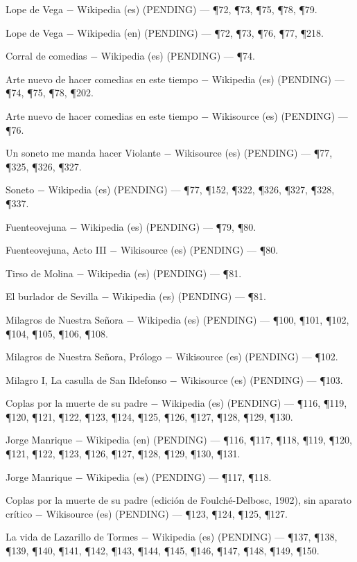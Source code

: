 \documentclass{book}
\begin{document}
\noindent Lope de Vega \(-\) Wikipedia (es) (PENDING) --- \P72, \P73, \P75, \P78, \P79.

\noindent Lope de Vega \(-\) Wikipedia (en) (PENDING) --- \P72, \P73, \P76, \P77, \P218.

\noindent Corral de comedias \(-\) Wikipedia (es) (PENDING) --- \P74.

\noindent Arte nuevo de hacer comedias en este tiempo \(-\) Wikipedia (es) (PENDING) --- \P74, \P75, \P78, \P202.

\noindent Arte nuevo de hacer comedias en este tiempo \(-\) Wikisource (es) (PENDING) --- \P76.

\noindent Un soneto me manda hacer Violante \(-\) Wikisource (es) (PENDING) --- \P77, \P325, \P326, \P327.

\noindent Soneto \(-\) Wikipedia (es) (PENDING) --- \P77, \P152, \P322, \P326, \P327, \P328, \P337.

\noindent Fuenteovejuna \(-\) Wikipedia (es) (PENDING) --- \P79, \P80.

\noindent Fuenteovejuna, Acto III \(-\) Wikisource (es) (PENDING) --- \P80.

\noindent Tirso de Molina \(-\) Wikipedia (es) (PENDING) --- \P81.

\noindent El burlador de Sevilla \(-\) Wikipedia (es) (PENDING) --- \P81.

\noindent Milagros de Nuestra Señora \(-\) Wikipedia (es) (PENDING) --- \P100, \P101, \P102, \P104, \P105, \P106, \P108.

\noindent Milagros de Nuestra Señora, Prólogo \(-\) Wikisource (es) (PENDING) --- \P102.

\noindent Milagro I, La casulla de San Ildefonso \(-\) Wikisource (es) (PENDING) --- \P103.

\noindent Coplas por la muerte de su padre \(-\) Wikipedia (es) (PENDING) --- \P116, \P119, \P120, \P121, \P122, \P123, \P124, \P125, \P126, \P127, \P128, \P129, \P130.

\noindent Jorge Manrique \(-\) Wikipedia (en) (PENDING) --- \P116, \P117, \P118, \P119, \P120, \P121, \P122, \P123, \P126, \P127, \P128, \P129, \P130, \P131.

\noindent Jorge Manrique \(-\) Wikipedia (es) (PENDING) --- \P117, \P118.

\noindent Coplas por la muerte de su padre (edición de Foulché-Delbosc, 1902), sin aparato crítico \(-\) Wikisource (es) (PENDING) --- \P123, \P124, \P125, \P127.

\noindent La vida de Lazarillo de Tormes \(-\) Wikipedia (es) (PENDING) --- \P137, \P138, \P139, \P140, \P141, \P142, \P143, \P144, \P145, \P146, \P147, \P148, \P149, \P150.
\end{document}
